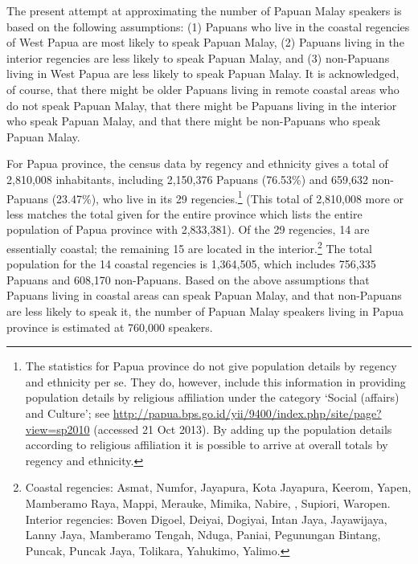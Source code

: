 {The present attempt at approximating the number of Papuan Malay speakers is based on the following assumptions: (1) Papuans who live in the coastal regencies of West Papua are most likely to speak Papuan Malay, (2) Papuans living in the interior regencies are less likely to speak Papuan Malay, and (3) non-Papuans living in West Papua are less likely to speak Papuan Malay. It is acknowledged, of course, that there might be older Papuans living in remote coastal areas who do not speak Papuan Malay, that there might be Papuans living in the interior who speak Papuan Malay, and that there might be non-Papuans who speak Papuan Malay.



For Papua province, the census data by regency and ethnicity gives a total of 2,810,008 inhabitants, including 2,150,376 Papuans (76.53\%) and 659,632 non-Papuans (23.47\%), who live in its 29 regencies.\footnote{\label{Footnote_1.40}The statistics for Papua province do not give population details by regency and ethnicity per se. They do, however, include this information in providing population details by religious affiliation under the category  ‘Social (affairs) and Culture’; see \url{http://papua.bps.go.id/yii/9400/index.php/site/page?view=sp2010} (accessed 21 Oct 2013). By adding up the population details according to religious affiliation it is possible to arrive at overall totals by regency and ethnicity.} (This total of 2,810,008 more or less matches the total given for the entire province which lists the entire population of Papua province with 2,833,381). Of the 29 regencies, 14 are essentially coastal; the remaining 15 are located in the interior.\footnote{Coastal regencies: Asmat,  Numfor, Jayapura, Kota Jayapura, Keerom, Yapen, Mamberamo Raya, Mappi, Merauke, Mimika, Nabire, , Supiori, Waropen.\\
Interior regencies: Boven Digoel, Deiyai, Dogiyai, Intan Jaya, Jayawijaya, Lanny Jaya, Mamberamo Tengah, Nduga, Paniai, Pegunungan Bintang, Puncak, Puncak Jaya, Tolikara, Yahukimo, Yalimo.} The total population for the 14 coastal regencies is 1,364,505, which includes 756,335 Papuans and 608,170 non-Papuans. Based on the above assumptions that Papuans living in coastal areas can speak Papuan Malay, and that non-Papuans are less likely to speak it, the number of Papuan Malay speakers living in Papua province is estimated at 760,000 speakers.



}
